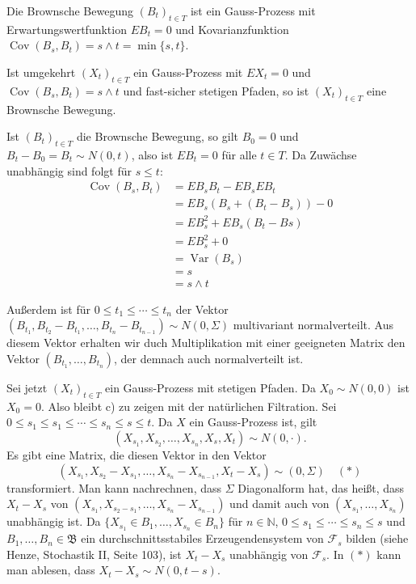 \documentclass[a4paper,twoside,DIV15,BCOR12mm]{scrbook}
\newcommand{\cF}{\mathcal F}
\newcommand{\borel}{{\mathfrak B}}
\begin{document}
\begin{satz}
\label{satz:9.2}
Die Brownsche Bewegung $(B_t)_{t\in T}$ ist ein Gauss-Prozess mit Erwartungswertfunktion $EB_t =0$ und Kovarianzfunktion $\operatorname{Cov}(B_s,B_t)=s\wedge t = \min\{s,t\}$.

Ist umgekehrt $(X_t)_{t\in T}$ ein Gauss-Prozess mit $EX_t=0$ und $\operatorname{Cov}(B_s,B_t)=s\wedge t$ und fast-sicher stetigen Pfaden, so ist $(X_t)_{t\in T}$ eine Brownsche Bewegung.
\end{satz}

\begin{beweis}
Ist $(B_t)_{t\in T}$ die Brownsche Bewegung, so gilt $B_0=0$ und $B_t-B_0=B_t\sim N(0,t)$, also ist $EB_t=0$ für alle $t\in T$. Da Zuwächse unabhängig sind folgt für $s\le t$:
\begin{align*}
\operatorname{Cov}(B_s,B_t) &= EB_sB_t - EB_sEB_t\\
&= EB_s(B_s + (B_t-B_s)) - 0\\
&= EB_s^2 + EB_s(B_t-Bs) \\
&= EB_s^2 + 0 \\
&= \operatorname{Var}(B_s)  \\
&= s \\
&= s\wedge t
\end{align*}

Außerdem ist für $0\le t_1\le\cdots\le t_n$ der Vektor $(B_{t_1},B_{t_2}-B_{t_1},\ldots,B_{t_n}-B_{t_{n-1}})\sim N(0,\Sigma)$ multivariant normalverteilt. Aus diesem Vektor erhalten wir duch Multiplikation mit einer geeigneten Matrix den Vektor $(B_{t_1},\ldots,B_{t_n})$, der demnach auch normalverteilt ist.

Sei jetzt $(X_t)_{t\in T}$ ein Gauss-Prozess mit stetigen Pfaden. Da $X_0\sim N(0,0)$ ist $X_0=0$. Also bleibt c) zu zeigen mit der natürlichen Filtration. Sei $0\le s_1\le s_1\le \cdots \le s_n\le s \le t$. Da $X$ ein Gauss-Prozess ist, gilt 
\[
(X_{s_1},X_{s_2},\ldots,X_{s_n},X_s,X_t)\sim N(0,\cdot).
\]
Es gibt eine Matrix, die diesen Vektor in den Vektor 
\[
(X_{s_1},X_{s_2}-X_{s_1},\ldots,X_{s_n}-X_{s_{n-1}},X_t-X_s)\sim(0,\Sigma) \quad (*)
\]
transformiert. Man kann nachrechnen, dass $\Sigma$ Diagonalform hat, das heißt, dass $X_t -X_s$ von $(X_{s_1},X_{s_2-s_1},\ldots,X_{s_n}-X_{s_{n-1}})$ und damit auch von $(X_{s_1},\ldots,X_{s_n})$ unabhängig ist. Da $\{X_{s_1}\in B_1,\ldots,X_{s_n}\in B_n\}$ für $n\in \mathbb N$, $0\le s_1\le \cdots\le s_n\le s$ und $B_1,\ldots,B_n\in \borel$ ein durchschnittsstabiles Erzeugendensystem von $\cF_s$ bilden (siehe Henze, Stochastik II, Seite 103), ist $X_t-X_s$ unabhängig von $\cF_s$. In $(*)$ kann man ablesen, dass $X_t-X_s\sim N(0,t-s)$.
\end{beweis}
\end{document}
